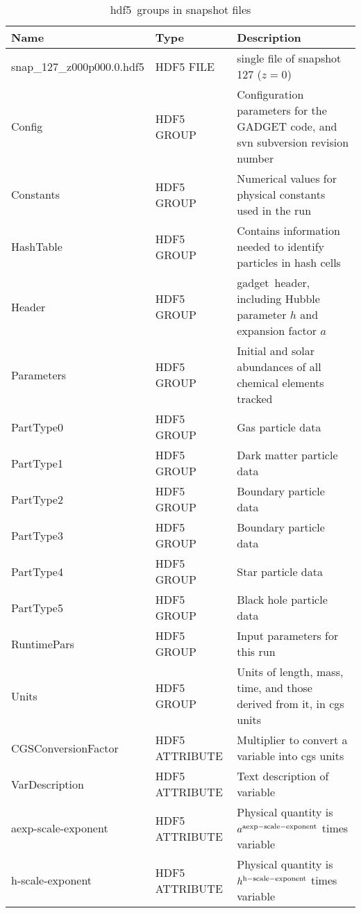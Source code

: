 \documentclass[10pt, a4paper]{article}
\newcommand{\hdf}{{\sc hdf5}}
\newcommand{\gadget}{{\sc gadget}}
\begin{document}
\begin{table}
\label{TabFileLayout}
\caption{\hdf\ groups in snapshot files}
\centering
\renewcommand{\arraystretch}{1.5}
\footnotesize
\vspace{5pt}
\begin{tabular}{>{\ttfamily}p{4cm}p{3cm}p{9.5cm}}
\hline
Name & Type & Description \\
\hline
snap\_127\_z000p000.0.hdf5 & HDF5 FILE & single file of snapshot 127 ($z=0$) \\
\hline
Config & HDF5 GROUP & Configuration parameters for the GADGET code, and svn subversion revision number \\
Constants & HDF5 GROUP & Numerical values for physical constants used in the run \\
HashTable & HDF5 GROUP & Contains information needed to identify particles in hash cells \\
Header & HDF5 GROUP & \gadget\ header, including Hubble parameter $h$ and expansion factor $a$ \\
Parameters & HDF5 GROUP & Initial and solar abundances of all chemical elements tracked \\
PartType0 & HDF5 GROUP & Gas particle data \\
PartType1 & HDF5 GROUP & Dark matter particle data  \\
PartType2 & HDF5 GROUP & Boundary particle data \\
PartType3 & HDF5 GROUP & Boundary particle data \\
PartType4 & HDF5 GROUP & Star particle data \\
PartType5 & HDF5 GROUP & Black hole particle data \\
RuntimePars & HDF5 GROUP & Input parameters for this run \\
Units & HDF5 GROUP & Units of length, mass, time, and those derived from it, in cgs units \\
\hline
CGSConversionFactor & HDF5 ATTRIBUTE & Multiplier to convert a variable into cgs units \\
VarDescription & HDF5 ATTRIBUTE & Text description of variable \\
aexp-scale-exponent & HDF5 ATTRIBUTE & Physical quantity is $a^{\rm aexp-scale-exponent}$ times variable \\
h-scale-exponent & HDF5 ATTRIBUTE & Physical quantity is $h^{\rm h-scale-exponent}$ times variable \\
\hline

\end{tabular}
\label{TabGroups}
\end{table}
\end{document}
